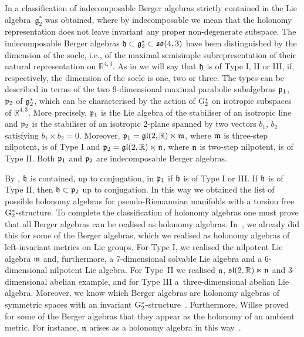 \documentclass[pdftex]{sigma}
\numberwithin{equation}{section}
\newcommand\fh{{\frak h}}
\newcommand\fn{{\frak n}}
\newcommand{\G}{\mathop{{{\rm G}_{2}^*}}}
\begin{document}
In \cite{FK} a classification of indecomposable Berger algebras strictly contained in the Lie algebra~$\mathfrak g_2^*$ was obtained, where by indecomposable we mean that the holonomy representation does not leave invariant any proper non-degenerate subspace. The indecomposable Berger algebras $\fh \subset \mathfrak g_2^* \subset \mathfrak{so}(4, 3)$ have been distinguished by the dimension of the socle, i.e., of the maximal semisimple subrepresentation of their natural representation on ${\mathbb R}^{4,3}$. As in \cite{FK} we will say that $\fh$ is of Type I, II or III, if, respectively, the dimension of the socle is one, two or three. The types can be described in terms of the two 9-dimensional maximal parabolic subalgebras $\frak p_1$, $\frak p_2 $ of $\frak g_2^*$, which can be characterised by the action of $\G$ on isotropic subspaces of $\mathbb R^{4,3}$. More precisely, $\frak p_1$ is the Lie algebra of the stabiliser of an isotropic line and $\frak p_2$ is the stabiliser of an isotropic 2-plane spanned by two vectors $b_1$, $b_2$ satisfying $b_1 \times b_2 = 0$. Moreover, $\frak p_1 = {\frak {gl}} (2,\mathbb R) \ltimes \frak m$, where $\frak m$ is three-step nilpotent, is of Type I and $\frak p_2 = {\frak {gl}} (2,\mathbb R) \ltimes \frak n$, where $\frak n$ is two-step nilpotent, is of Type II.
Both $\frak p_1$ and $\frak p_2$ are indecomposable Berger algebras.

By \cite{FK}, $\frak h$ is contained, up to conjugation, in $\frak p_1$ if $\frak h$ is of Type I or III. If $\frak h$ is of Type II, then $\frak h \subset \frak p_2$ up to conjugation. In this way we obtained the list of possible holonomy algebras for pseudo-Riemannian manifolds with a torsion free $\G$-structure. To complete the classification of holonomy algebras one must prove that all Berger algebras can be realised as holonomy algebras. In~\cite{FK}, we already did this for some of the Berger algebras, which we realised as holonomy algebras of left-invariant metrics on Lie groups. For Type I, we realised the nilpotent Lie algebra $\frak m$ and, furthermore, a 7-dimensional solvable Lie algebra and a 6-dimensional nilpotent Lie algebra. For Type~II we realised $\frak n$, ${\frak {sl}}(2, \mathbb R) \ltimes \frak n$ and 3-dimensional abelian example, and for Type III a~three-dimensional abelian Lie algebra. Moreover, we know which Berger algebras are holonomy algebras of symmetric spaces with an invariant $\G$-structure~\cite{FK, K}. Furthermore, Willse proved for some of the Berger algebras that they appear as the holonomy of an ambient metric. For instance, $\fn$ arises as a holonomy algebra in this way~\cite{W}.
\end{document}
